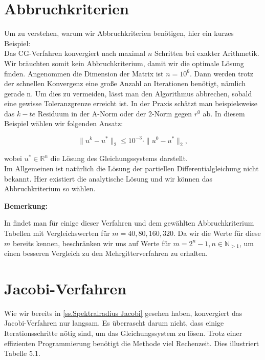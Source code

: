 

\section{Abbruchkriterien}

Um zu verstehen, warum wir Abbruchkriterien benötigen, hier ein kurzes Beispiel:\\
Das CG-Verfahren konvergiert nach maximal $n$ Schritten bei exakter Arithmetik. Wir bräuchten somit kein Abbruchkriterium, damit wir die optimale Lösung finden. Angenommen die Dimension der Matrix ist $n = 10^{6}$. Dann werden trotz der schnellen Konvergenz eine große Anzahl an Iterationen benötigt, nämlich gerade n. Um dies zu vermeiden, lässt man den Algorithmus abbrechen, sobald eine gewisse Toleranzgrenze erreicht ist. In der Praxis schätzt man beispielsweise das $k-te$ Residuum in der A-Norm oder der 2-Norm gegen $r^{0}$ ab. In diesem Beispiel wählen wir folgenden Ansatz:

\begin{equation}
\| u^{k} - u^{*} \|_{2} \le 10^{-3} \cdot \| u^{0} - u^{*} \|_{2},
\end{equation}

wobei $u^{*} \in \mathbb{R}^{n}$ die Lösung des Gleichungssystems darstellt.\\
Im Allgemeinen ist natürlich die Lösung der partiellen Differentialgleichung nicht bekannt. Hier existiert die analytische Lösung und wir können das Abbruchkriterium so wählen.

\textbf{Bemerkung:}

In \cite[S. 549-583]{DR08} findet man für einige dieser Verfahren und dem gewählten Abbruchkriterium Tabellen mit Vergleichswerten für $m = 40,80,160,320$. Da wir die Werte für diese $m$ bereits kennen, beschränken wir uns auf Werte für $m = 2^{n} - 1, n \in \mathbb{N}_{>1}$, um einen besseren Vergleich zu den Mehrgitterverfahren zu erhalten.

\section{Jacobi-Verfahren}\label{s.Jacobi mit Beispiel}

Wie wir bereits in \autoref{ss.Spektralradius Jacobi} gesehen haben, konvergiert das Jacobi-Verfahren nur langsam. Es überrascht darum nicht, dass einige Iterationsschritte nötig sind, um das Gleichungssystem zu lösen. Trotz einer effizienten Programmierung benötigt die Methode viel Rechenzeit. Dies illustriert Tabelle 5.1.

